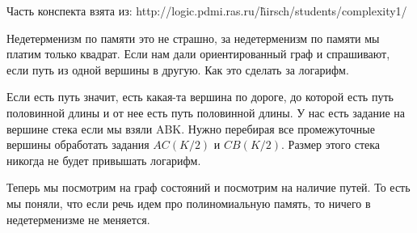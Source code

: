 \begin{Rem}
	Часть конспекта взята из: http://logic.pdmi.ras.ru/\~hirsch/students/complexity1/
\end{Rem}

Недетерменизм по памяти это не страшно, за недетерменизм по памяти мы платим только квадрат. Если нам 
дали ориентированный граф и спрашивают, если путь из одной вершины в другую. Как это сделать за логарифм. 

Если есть путь значит, есть какая-та вершина по дороге, до которой есть путь половинной длины и от нее есть путь 
половинной длины. У нас есть задание на вершине стека если мы взяли ABK. Нужно перебирая все промежуточные вершины обработать задания  
$AC(K/2)$ и $CB(K/2)$. Размер этого стека никогда не будет привышать логарифм.

Теперь мы посмотрим на граф состояний и посмотрим на наличие путей. То есть мы поняли, что
если речь идем про полиномиальную память, то ничего в недетерменизме не меняется.  
